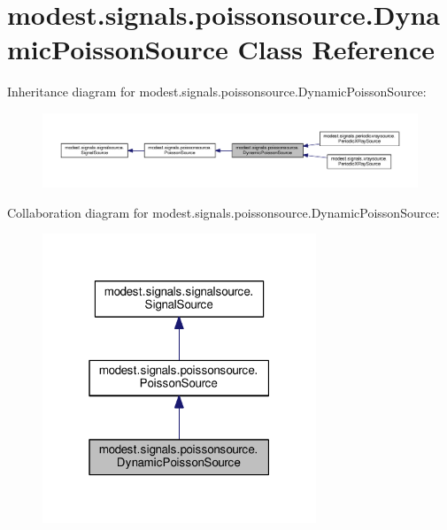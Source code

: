 \hypertarget{classmodest_1_1signals_1_1poissonsource_1_1DynamicPoissonSource}{}\section{modest.\+signals.\+poissonsource.\+Dynamic\+Poisson\+Source Class Reference}
\label{classmodest_1_1signals_1_1poissonsource_1_1DynamicPoissonSource}


Inheritance diagram for modest.\+signals.\+poissonsource.\+Dynamic\+Poisson\+Source\+:
\nopagebreak
\begin{figure}[H]
\begin{center}
\leavevmode
\includegraphics[width=350pt]{classmodest_1_1signals_1_1poissonsource_1_1DynamicPoissonSource__inherit__graph}
\end{center}
\end{figure}


Collaboration diagram for modest.\+signals.\+poissonsource.\+Dynamic\+Poisson\+Source\+:\nopagebreak
\begin{figure}[H]
\begin{center}
\leavevmode
\includegraphics[width=232pt]{classmodest_1_1signals_1_1poissonsource_1_1DynamicPoissonSource__coll__graph}
\end{center}
\end{figure}
